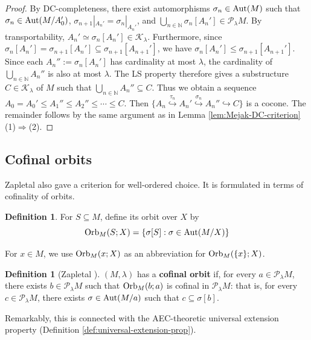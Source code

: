 \documentclass[10pt]{amsart}
\numberwithin{equation}{section}
\theoremstyle{plain}
\theoremstyle{definition}
\newtheorem{definition}[theorem]{Definition}
\newcommand{\N}{\mathbb{N}}
\newcommand{\K}{\mathcal{K}}
\newcommand{\embed}{\hookrightarrow}
\newcommand{\embedge}[1]{\overset{#1}{\embed}}
\begin{document}
\begin{proof}
By DC-completeness, there exist automorphisms $\sigma_n\in{\rm Aut}(M)$ such that $\sigma_n\in{\rm Aut}(M/A_0')$, $\sigma_{n+1}|_{A_n'}=\sigma_n|_{A_n'}$, and $\bigcup_{n\in\N}\sigma_n[A_n']\in\mathcal{P}_\lambda M$.
By transportability, $A_n'\simeq \sigma_n[A_n']\in\K_\lambda$.
Furthermore, since $\sigma_n[A_n']=\sigma_{n+1}[A_n']\subseteq\sigma_{n+1}[A_{n+1}']$, we have $\sigma_n[A_n']\leq \sigma_{n+1}[A_{n+1}']$.
Since each $A_n'':=\sigma_n[A_n']$ has cardinality at most $\lambda$, the cardinality of $\bigcup_{n\in\N} A_n''$ is also at most $\lambda$.
The LS property therefore gives a substructure $C\in\K_\lambda$ of $M$ such that $\bigcup_{n\in\N}A_n''\subseteq C$.
Thus we obtain a sequence $A_0=A_0'\leq A_1''\leq A_2''\leq\cdots\leq C$.
Then $\{A_n\embedge{\tau_n}A_n'\embedge{\sigma_n}A_n''\embed C\}$ is a cocone.
The remainder follows by the same argument as in Lemma \ref{lem:Mejak-DC-criterion} (1)$\Rightarrow$(2).
\end{proof}




\subsection{Cofinal orbits}

Zapletal \cite{Zap26} also gave a criterion for well-ordered choice.
It is formulated in terms of cofinality of orbits.

\begin{definition}
For $S\subseteq M$, define its orbit over $X$ by
\[
{\rm Orb}_M(S;X)=\{\sigma[S]:\sigma\in {\rm Aut}(M/X)\}
\]

For $x\in M$, we use ${\rm Orb}_M(x;X)$ as an abbreviation for ${\rm Orb}_M(\{x\};X)$.
\end{definition}


\begin{definition}[Zapletal {\cite[Definition 3.2]{Zap26}}]
$(M,\lambda)$ has a {\bf cofinal orbit} if, for every $a\in \mathcal{P}_\lambda M$, there exists $b\in \mathcal{P}_\lambda M$ such that ${\rm Orb}_M(b;a)$ is cofinal in $\mathcal{P}_\lambda M$:
that is, for every $c\in \mathcal{P}_\lambda M$, there exists $\sigma\in {\rm Aut}(M/a)$ such that $c\subseteq\sigma[b]$.
\end{definition}

Remarkably, this is connected with the AEC-theoretic universal extension property (Definition \ref{def:universal-extension-prop}).
\end{document}
